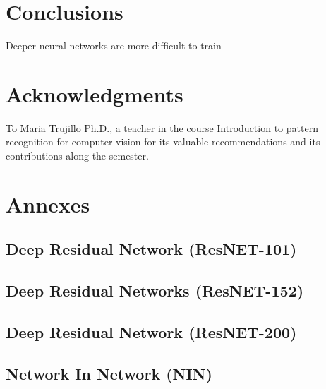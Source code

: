 \documentclass[12pt]{article}
\numberwithin{equation}{section}
\numberwithin{table}{section}
\numberwithin{figure}{section}
\begin{document}
\section{Conclusions}

Deeper neural networks are more difficult to train \cite{Zagoruyko2016}






\section*{Acknowledgments}

To Maria Trujillo Ph.D., a teacher in the course Introduction to pattern recognition for computer vision for its valuable recommendations and its contributions along the semester.
 





\newpage

\section*{Annexes}

\subsection{Deep Residual Network (ResNET-101)}


\subsection{Deep Residual Networks (ResNET-152)}



\subsection{Deep Residual Network (ResNET-200)}



\subsection{Network In Network (NIN)}

\end{document}
